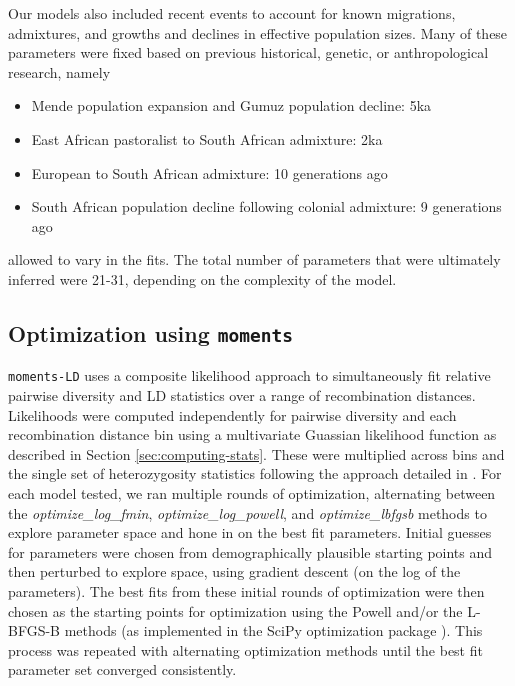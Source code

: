 \documentclass[]{article}
\newcommand{\moments}{\texttt{moments}\xspace}
\begin{document}
Our models also included recent events to account for known migrations,
admixtures, and growths and declines in effective population sizes. Many of
these parameters were fixed based on previous historical, genetic, or
anthropological research, namely
\begin{itemize}
    \item Mende population expansion and Gumuz population decline: 5ka \citep{Gopalan2022-pw}
    \item East African pastoralist to South African admixture: 2ka \citep{Uren2016-nn}
    \item European to South African admixture: 10 generations ago
    \item South African population decline following colonial admixture: 9 generations ago
\end{itemize}
allowed to vary in the fits. The total number of parameters that were
ultimately inferred were 21-31, depending on the complexity
of the model.


\subsection{Optimization using \moments}

\texttt{moments-LD} uses a composite likelihood approach to simultaneously fit relative
pairwise diversity and LD statistics over a range of recombination distances.
Likelihoods were computed independently for pairwise diversity and each
recombination distance bin using a multivariate Guassian likelihood function as
described in Section \ref{sec:computing-stats}. These were multiplied across
bins and the single set of heterozygosity statistics following the approach
detailed in \citet{Ragsdale2019-nt}. For each model tested, we ran multiple
rounds of optimization, alternating between the \emph{optimize\_log\_fmin},
\emph{optimize\_log\_powell}, and \emph{optimize\_lbfgsb} methods to explore
parameter space and hone in on the best fit parameters. Initial guesses for
parameters were chosen from demographically plausible starting points and then
perturbed to explore space, using gradient descent (on the log of the
parameters). The best fits from these initial rounds of optimization were then
chosen as the starting points for optimization using the Powell and/or the
L-BFGS-B methods (as implemented in the SciPy optimization package
\citep{Virtanen2020-kr}). This process was repeated with alternating
optimization methods until the best fit parameter set converged consistently.
\end{document}
